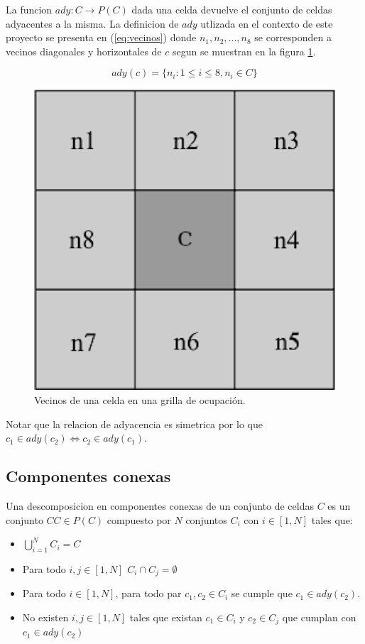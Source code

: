 La funcion $ady : C \rightarrow P(C)$ dada una celda devuelve el conjunto de
celdas adyacentes a la misma. La definicion de $ady$ utlizada en el contexto de
este proyecto se presenta en (\ref{eq:vecinos}) donde $n_1, n_2, ..., n_8$ se
corresponden a vecinos diagonales y horizontales de $c$ segun se muestran en la
figura \ref{fig:vecinos}.

\begin{equation} 
 ady(c)=\{n_i : 1\leq i \leq 8, n_i \in C\}
 \label{eq:vecinos}
\end{equation} 

\begin{figure}[H]
  \center
  \includegraphics[width=0.3\linewidth]{imagenes/vecinosSharp.png}
  \caption[Vecinos de una celda en una grilla de ocupación.]{Vecinos de una celda en una grilla de ocupación.}
  \label{fig:vecinos}
\end{figure} 

Notar que la relacion de adyacencia es simetrica por lo que $c_1 \in ady(c_2) \Leftrightarrow c_2 \in ady(c_1)$.

\subsection{Componentes conexas} \label{subsec:CompComp}
Una descomposicion en componentes conexas de un conjunto de
celdas $C$ es un conjunto $CC\in P(C)$ compuesto por $N$ conjuntos $C_i$ con
$i\in[1,N]$ tales que:
\begin{itemize}
  \item $\bigcup_{i=1}^{N}C_i = C$ 
  \item Para todo $i,j \in [1,N]$ $C_i\cap C_j = \emptyset$
  \item Para todo $i \in [1,N]$, para todo par $c_1,c_2 \in C_i$ se cumple que $c_1 \in ady(c_2)$.
  \item No existen $i,j \in [1,N]$ tales que existan $c_1 \in C_i$ y $c_2 \in C_j$ que cumplan con $c_1 \in ady(c_2)$ 
\end{itemize}

